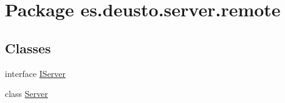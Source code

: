 \hypertarget{namespacees_1_1deusto_1_1server_1_1remote}{}\section{Package es.\+deusto.\+server.\+remote}
\label{namespacees_1_1deusto_1_1server_1_1remote}
\subsection*{Classes}
\begin{DoxyCompactItemize}
\item 
interface \mbox{\hyperlink{interfacees_1_1deusto_1_1server_1_1remote_1_1_i_server}{I\+Server}}
\item 
class \mbox{\hyperlink{classes_1_1deusto_1_1server_1_1remote_1_1_server}{Server}}
\end{DoxyCompactItemize}
